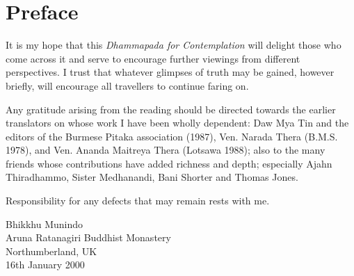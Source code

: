 

\chapter[Preface to the first edition (2000)]{Preface}

It is my hope that this \emph{Dhammapada for Contemplation} will delight those who come across it and serve to encourage further viewings from different perspectives. I trust that whatever glimpses of truth may be gained, however briefly, will encourage all travellers to continue faring on.

Any gratitude arising from the reading should be directed towards the earlier translators on whose work I have been wholly dependent: Daw Mya Tin and  the editors of the  Burmese Pitaka association (1987), Ven. Narada Thera (B.M.S. 1978), and Ven. Ananda Maitreya Thera  (Lotsawa 1988); also to the many friends whose contributions have added richness and depth; especially Ajahn Thiradhammo, Sister Medhanandi, Bani Shorter and Thomas Jones.

Responsibility for any defects that may remain rests with me.

{\raggedleft
Bhikkhu Munindo\\
Aruna Ratanagiri Buddhist Monastery\\
Northumberland, UK\\
16th January 2000
\par}

